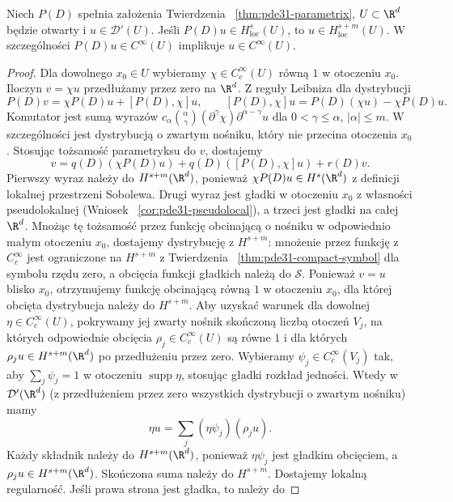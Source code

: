 \begin{wniosek}
\label{cor:pde31-local-ellipticity}
Niech $P(D)$ spełnia założenia Twierdzenia
~\ref{thm:pde31-parametrix}, $U\subset\R^d$
będzie otwarty i $u\in\mathcal D'(U)$.
Jeśli $P(D)u\in H^s_{\mathrm{loc}}(U)$,
to $u\in H^{s+m}_{\mathrm{loc}}(U)$.
W szczególności $P(D)u\in C^\infty(U)$
implikuje $u\in C^\infty(U)$.
\end{wniosek}
\begin{proof}
Dla dowolnego $x_0\in U$ wybieramy
$\chi\in C_c^\infty(U)$ równą $1$ w otoczeniu
$x_0$. Iloczyn $v=\chi u$ przedłużamy przez zero
na $\R^d$. Z reguły Leibniza dla dystrybucji
\[
 P(D)v=\chi P(D)u+[P(D),\chi]u,
 \qquad [P(D),\chi]u=P(D)(\chi u)-\chi P(D)u.
\]
Komutator jest sumą wyrazów
$c_\alpha\binom{\alpha}{\gamma}
(\partial^\gamma\chi)\partial^{\alpha-\gamma}u$
dla $0<\gamma\le\alpha$, $|\alpha|\le m$.
W szczególności jest dystrybucją o zwartym
nośniku, który nie przecina otoczenia $x_0$.
Stosując tożsamość parametryksu do $v$, dostajemy
\[
 v=q(D)(\chi P(D)u)+q(D)([P(D),\chi]u)+r(D)v.
\]
Pierwszy wyraz należy do $H^{s+m}(\R^d)$,
ponieważ $\chi P(D)u\in H^s(\R^d)$
z definicji lokalnej przestrzeni Sobolewa.
Drugi wyraz jest gładki w otoczeniu $x_0$
z własności pseudolokalnej (Wniosek
~\ref{cor:pde31-pseudolocal}), a trzeci
jest gładki na całej $\R^d$.
Mnożąc tę tożsamość przez funkcję obcinającą
o nośniku w odpowiednio małym otoczeniu $x_0$,
dostajemy dystrybucję z $H^{s+m}$: mnożenie
przez funkcję z $C_c^\infty$ jest ograniczone
na $H^{s+m}$ z Twierdzenia
~\ref{thm:pde31-compact-symbol} dla symbolu rzędu zero,
a obcięcia funkcji gładkich należą do $\mathcal S$.
Ponieważ $v=u$ blisko $x_0$, otrzymujemy
funkcję obcinającą równą $1$ w otoczeniu $x_0$,
dla której obcięta dystrybucja należy do $H^{s+m}$.
Aby uzyskać warunek dla dowolnej $\eta\in C_c^\infty(U)$,
pokrywamy jej zwarty nośnik skończoną liczbą
otoczeń $V_j$, na których odpowiednie obcięcia
$\rho_j\in C_c^\infty(U)$ są równe $1$
i dla których $\rho_j u\in H^{s+m}(\R^d)$
po przedłużeniu przez zero.
Wybieramy $\psi_j\in C_c^\infty(V_j)$
tak, aby $\sum_j\psi_j=1$ w otoczeniu
$\operatorname{supp}\eta$, stosując gładki
rozkład jedności. Wtedy w $\mathcal D'(\R^d)$
(z przedłużeniem przez zero wszystkich
dystrybucji o zwartym nośniku) mamy
\[
 \eta u=\sum_j(\eta\psi_j)(\rho_j u).
\]
Każdy składnik należy do $H^{s+m}(\R^d)$,
ponieważ $\eta\psi_j$ jest gładkim obcięciem,
a $\rho_j u\in H^{s+m}(\R^d)$.
Skończona suma należy do $H^{s+m}$.
Dostajemy lokalną regularność.
Jeśli prawa strona jest gładka, to należy do

\end{proof}
